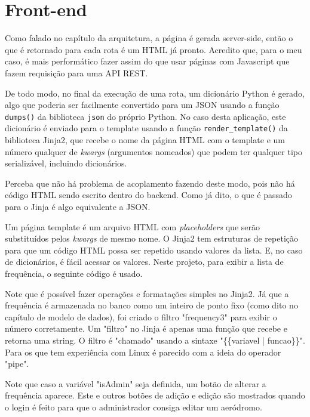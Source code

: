 \chapter{Front-end}

Como falado no capítulo da arquitetura, a página é gerada server-side, então o que 
é retornado para cada rota é um HTML já pronto. Acredito que, para o meu caso, é mais 
performático fazer assim do que usar páginas com Javascript que fazem requisição para uma API REST.

De todo modo, no final da execução de uma rota, um dicionário Python é gerado, algo que 
poderia ser facilmente convertido para um JSON usando a função \texttt{dumps()} da 
biblioteca \texttt{json} do próprio Python. No caso desta aplicação, este dicionário é 
enviado para o template usando a função \texttt{render\_template()} da biblioteca Jinja2, 
que recebe o nome da página HTML com o template e um número qualquer de \textit{kwargs} (argumentos nomeados) 
que podem ter qualquer tipo serializável, incluindo dicionários.

Perceba que não há problema de acoplamento fazendo deste modo, pois não há código HTML sendo 
escrito dentro do backend. Como já dito, o que é passado para o Jinja é algo equivalente a JSON.

Um página template é um arquivo HTML com \textit{placeholders} que serão substituídos pelos 
\textit{kwargs} de mesmo nome. O Jinja2 tem estruturas de repetição para que um código HTML 
possa ser repetido usando valores da lista. E, no caso de dicionários, é fácil acessar 
os valores. Neste projeto, para exibir a lista de frequência, o seguinte código é usado.

Note que é possível fazer operações e formatações simples no Jinja2. Já que a frequência 
é armazenada no banco como um inteiro de ponto fixo (como dito no capítulo de modelo de dados), 
foi criado o filtro "frequency3" para exibir o número corretamente. Um "filtro" no Jinja 
é apenas uma função que recebe e retorna
uma string. O filtro é "chamado" usando a sintaxe "\{\{variavel | funcao\}\}". Para os que tem
experiência com Linux é parecido com a ideia do operador "pipe".



Note que caso a variável "isAdmin" seja definida, um botão de alterar a frequência aparece. Este
e outros botões de adição e edição são mostrados quando o login é feito para que o administrador
consiga editar um aeródromo.

